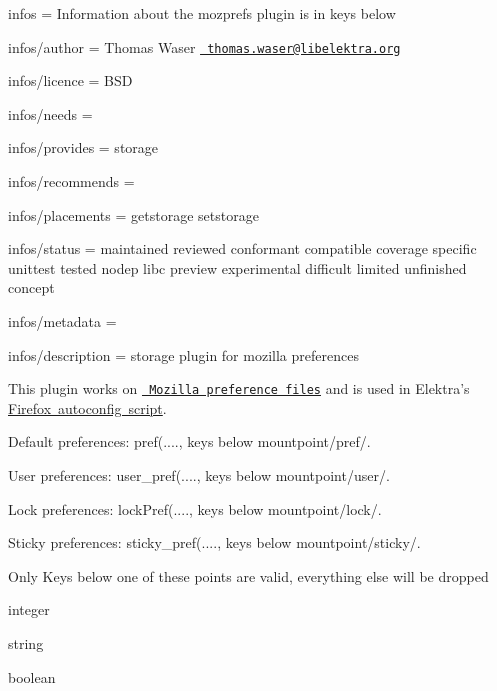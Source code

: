
\begin{DoxyItemize}
\item infos = Information about the mozprefs plugin is in keys below
\item infos/author = Thomas Waser \href{mailto:thomas.waser@libelektra.org}{\texttt{ thomas.\+waser@libelektra.\+org}}
\item infos/licence = B\+SD
\item infos/needs =
\item infos/provides = storage
\item infos/recommends =
\item infos/placements = getstorage setstorage
\item infos/status = maintained reviewed conformant compatible coverage specific unittest tested nodep libc preview experimental difficult limited unfinished concept
\item infos/metadata =
\item infos/description = storage plugin for mozilla preferences
\end{DoxyItemize}

This plugin works on \href{https://developer.mozilla.org/en-US/docs/Mozilla/Preferences/A_brief_guide_to_Mozilla_preferences}{\texttt{ Mozilla preference files}} and is used in Elektra’s \mbox{\hyperlink{autotoc_md464_src_plugins_mozprefs_autoconfig_README_md}{Firefox autoconfig script}}.


\begin{DoxyItemize}
\item Default preferences\+: {\ttfamily pref(....}, keys below {\ttfamily mountpoint/pref/}.
\item User preferences\+: {\ttfamily user\+\_\+pref(....}, keys below {\ttfamily mountpoint/user/}.
\item Lock preferences\+: {\ttfamily lock\+Pref(....}, keys below {\ttfamily mountpoint/lock/}.
\item Sticky preferences\+: {\ttfamily sticky\+\_\+pref(....}, keys below {\ttfamily mountpoint/sticky/}.
\end{DoxyItemize}

Only Keys below one of these points are valid, everything else will be dropped


\begin{DoxyItemize}
\item {\ttfamily integer}
\item {\ttfamily string}
\item {\ttfamily boolean}
\end{DoxyItemize}

